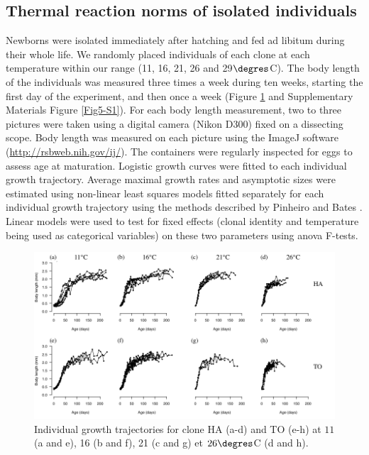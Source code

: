 \subsection{Thermal reaction norms of isolated individuals}

Newborns were isolated immediately after hatching and fed ad libitum during
their whole life. We randomly placed individuals of each clone at each
temperature within our range (11, 16, 21, 26 and 29$\degres$C). The body length
of the individuals was measured three times a week during ten weeks, starting the first
day of the experiment, and then once a week (Figure \ref{fig:AnFIP1} and
Supplementary Materials Figure \ref{Fig5-S1}).
For each body length measurement, two to three pictures were taken using a digital camera (Nikon D300) fixed on a
dissecting scope. Body length was measured on each picture using the ImageJ
software \autocites{abramoff2004a} (\url{http://rsbweb.nih.gov/ij/}). The
containers were regularly inspected for eggs to assess age at maturation. Logistic growth curves
were fitted to each individual growth trajectory. Average maximal
growth rates and asymptotic sizes were estimated using non-linear least squares
models fitted separately for each individual growth trajectory using the methods
described by Pinheiro and Bates \autocites{pinheiro2000a}. Linear models were
used to test for fixed effects (clonal identity and temperature being used as categorical
variables) on these two parameters using anova F-tests.

\begin{figure}[!ht]
\begin{center}
\includegraphics[width=\textwidth]{1_CorpsDeThese/Resumes/Fig/FIP01}
\caption[Growth
trajectories]{Individual growth trajectories for clone HA (a-d)
and TO (e-h) at $11$ (a and e), 16 (b and f), 21 (c and g) et $26\degres$C (d and
h).}
\label{fig:AnFIP1}
\end{center}
\end{figure}


